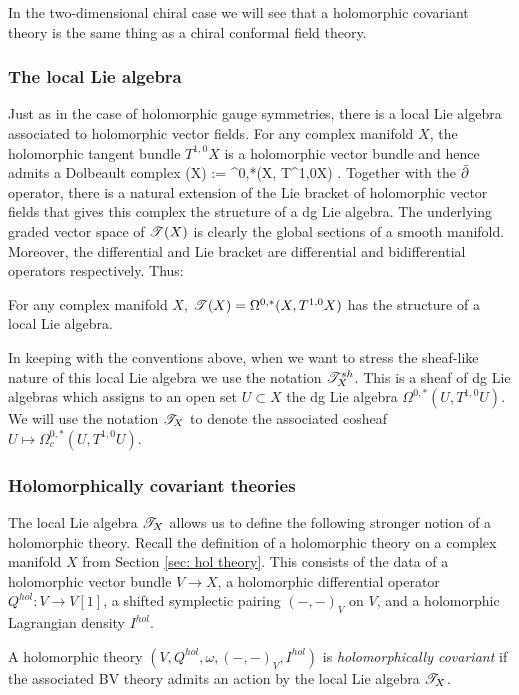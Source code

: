 \documentclass[10pt]{amsart}
\begin{document}
In the two-dimensional chiral case we will see that a holomorphic covariant theory is the same thing as a chiral conformal field theory.

\subsubsection{The local Lie algebra}

Just as in the case of holomorphic gauge symmetries, there is a local Lie algebra associated to holomorphic vector fields. 
For any complex manifold $X$, the holomorphic tangent bundle $T^{1,0}X$ is a holomorphic vector bundle and hence admits a Dolbeault complex
\ben
\sT(X) := \Omega^{0,*}(X, T^{1,0}X) .
\een
Together with the $\Bar{\partial}$ operator, there is a natural extension of the Lie bracket of holomorphic vector fields that gives this complex the structure of a dg Lie algebra.
The underlying graded vector space of $\mathscr T(X)$ is clearly the global sections of a smooth manifold.
Moreover, the differential and Lie bracket are differential and bidifferential operators respectively. 
Thus:

\begin{lem} 
For any complex manifold $X$, $\mathscr T(X) = \Omega^{0,*}(X, T^{1,0}X)$ has the structure of a local Lie algebra.
\end{lem}

In keeping with the conventions above, when we want to stress the sheaf-like nature of this local Lie algebra we use the notation $\mathscr T^{sh}_X$. 
This is a sheaf of dg Lie algebras which assigns to an open set $U \subset X$ the dg Lie algebra $\Omega^{0,*}(U, T^{1,0}U)$. 
We will use the notation $\mathscr T_X$ to denote the associated cosheaf $U \mapsto \Omega^{0,*}_c(U, T^{1,0}U)$.

\subsubsection{Holomorphically covariant theories}

The local Lie algebra $\mathscr T_X$ allows us to define the following stronger notion of a holomorphic theory. 
Recall the definition of a holomorphic theory on a complex manifold $X$ from Section \ref{sec: hol theory}.
This consists of the data of a holomorphic vector bundle $V \to X$, a holomorphic differential operator $Q^{hol} : V \to V[1]$, a shifted symplectic pairing $(-,-)_V$ on $V$, and a holomorphic Lagrangian density $I^{hol}$.

\begin{dfn}
A holomorphic theory $(V, Q^{hol}, \omega, (-,-)_V, I^{hol})$ is {\em holomorphically covariant} if the associated BV theory admits an action by the local Lie algebra $\mathscr T_X$.  
\end{dfn}
\end{document}
